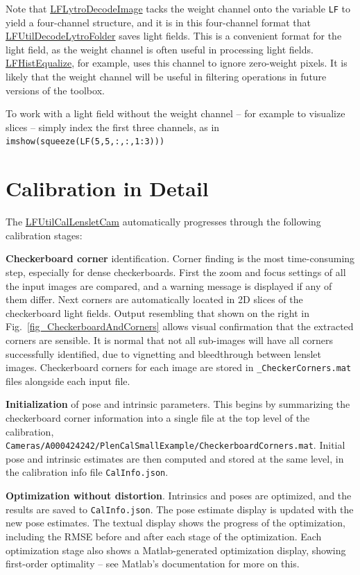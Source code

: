 \documentclass[onecolumn]{article}
\newcommand{\CiteFunction}[1]{\hyperlink{#1}{\small #1}}
\newcommand{\SymbolText}[1]{\texttt{\small #1}}
\begin{document}
Note that \CiteFunction{LFLytroDecodeImage} tacks the weight channel onto the variable \SymbolText{LF} to yield a four-channel structure, and it is in this four-channel format that \CiteFunction{LFUtilDecodeLytroFolder} saves light fields. This is a convenient format for the light field, as the weight channel is often useful in processing light fields.  \CiteFunction{LFHistEqualize}, for example, uses this channel to ignore zero-weight pixels. It is likely that the weight channel will be useful in filtering operations in future versions of the toolbox.

To work with a light field without the weight channel -- for example to visualize slices -- simply index the first three channels, as in\\ \SymbolText{imshow(squeeze(LF(5,5,:,:,1:3)))}

\section{Calibration in Detail}
\label{sect_Calibration}
The \CiteFunction{LFUtilCalLensletCam} automatically progresses through the following calibration stages:

\textbf{Checkerboard corner} identification.  Corner finding is the most time-consuming step, especially for dense checkerboards.  First the zoom and focus settings of all the input images are compared, and a warning message is displayed if any of them differ.  Next corners are automatically located in 2D slices of the checkerboard light fields.  Output resembling that shown on the right in Fig.~\ref{fig_CheckerboardAndCorners} allows visual confirmation that the extracted corners are sensible. It is normal that not all sub-images will have all corners successfully identified, due to vignetting and bleedthrough between lenslet images.  Checkerboard corners for each image are stored in \SymbolText{*\_CheckerCorners.mat} files alongside each input file.

\textbf{Initialization} of pose and intrinsic parameters. This begins by summarizing the checkerboard corner information into a single file at the top level of the calibration, \SymbolText{Cameras/A000424242/PlenCalSmallExample/CheckerboardCorners.mat}. Initial pose and intrinsic estimates are then computed and stored at the same level, in the calibration info file \SymbolText{CalInfo.json}.

\textbf{Optimization without distortion}.  Intrinsics and poses are optimized, and the results are saved to \SymbolText{CalInfo.json}.  The pose estimate display is updated with the new pose estimates. The textual display shows the progress of the optimization, including the RMSE before and after each stage of the optimization.  Each optimization stage also shows a Matlab-generated optimization display, showing first-order optimality -- see Matlab's documentation for more on this.
\end{document}
